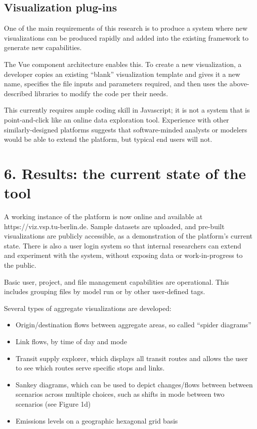 \hypertarget{visualization-plug-ins}{%
\subsection{Visualization plug-ins}\label{visualization-plug-ins}}

One of the main requirements of this research is to produce a system
where new visualizations can be produced rapidly and added into the
existing framework to generate new capabilities.

The Vue component architecture enables this. To create a new
visualization, a developer copies an existing ``blank'' visualization
template and gives it a new name, specifies the file inputs and
parameters required, and then uses the above-described libraries to
modify the code per their needs.

This currently requires ample coding skill in Javascript; it is not a
system that is point-and-click like an online data exploration tool.
Experience with other similarly-designed platforms suggests that
software-minded analysts or modelers would be able to extend the
platform, but typical end users will not.

\hypertarget{results-the-current-state-of-the-tool}{%
\section{6. Results: the current state of the
tool}\label{results-the-current-state-of-the-tool}}

A working instance of the platform is now online and available at
https://viz.vsp.tu-berlin.de. Sample datasets are uploaded, and
pre-built visualizations are publicly accessible, as a demonstration of
the platform's current state. There is also a user login system so that
internal researchers can extend and experiment with the system, without
exposing data or work-in-progress to the public.

Basic user, project, and file management capabilities are operational.
This includes grouping files by model run or by other user-defined tags.

Several types of aggregate visualizations are developed:

\begin{itemize}
\tightlist
\item
  Origin/destination flows between aggregate areas, so called ``spider
  diagrams''
\item
  Link flows, by time of day and mode
\item
  Transit supply explorer, which displays all transit routes and allows
  the user to see which routes serve specific stops and links.
\item
  Sankey diagrams, which can be used to depict changes/flows between
  between scenarios across multiple choices, such as shifts in mode
  between two scenarios (see Figure 1d)
\item
  Emissions levels on a geographic hexagonal grid basis
\end{itemize}

